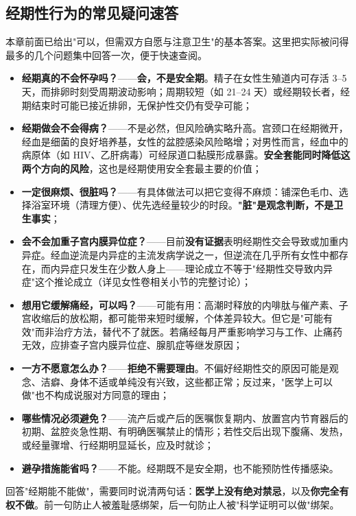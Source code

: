 \subsection{经期性行为的常见疑问速答}

本章前面已给出"可以，但需双方自愿与注意卫生"的基本答案。这里把实际被问得最多的几个问题集中回答一次，便于快速查阅。

\begin{itemize}
\item \textbf{经期真的不会怀孕吗？}——\textbf{会，不是安全期}。精子在女性生殖道内可存活 3--5 天，而排卵时刻受周期波动影响；周期较短（如 21--24 天）或经期较长者，经期结束时可能已接近排卵，无保护性交仍有受孕可能；
\item \textbf{经期做会不会得病？}——不是必然，但风险确实略升高。宫颈口在经期微开，经血是细菌的良好培养基，女性的盆腔感染风险略增；对男性而言，经血中的病原体（如 HIV、乙肝病毒）可经尿道口黏膜形成暴露。\textbf{安全套能同时降低这两个方向的风险}，这也是经期使用安全套最主要的价值；
\item \textbf{一定很麻烦、很脏吗？}——有具体做法可以把它变得不麻烦：铺深色毛巾、选择浴室环境（清理方便）、优先选经量较少的时段。\textbf{"脏"是观念判断，不是卫生事实}；
\item \textbf{会不会加重子宫内膜异位症？}——目前\textbf{没有证据}表明经期性交会导致或加重内异症。经血逆流是内异症的主流发病学说之一，但逆流在几乎所有女性中都存在，而内异症只发生在少数人身上——理论成立不等于"经期性交导致内异症"这个推论成立（详见女性卷相关小节的完整讨论）；
\item \textbf{想用它缓解痛经，可以吗？}——可能有用：高潮时释放的内啡肽与催产素、子宫收缩后的放松期，都可能带来短时缓解，个体差异较大。但它是"可能有效"而非治疗方法，替代不了就医。若痛经每月严重影响学习与工作、止痛药无效，应排查子宫内膜异位症、腺肌症等继发原因；
\item \textbf{一方不愿意怎么办？}——\textbf{拒绝不需要理由}。不偏好经期性交的原因可能是观念、洁癖、身体不适或单纯没有兴致，这些都正常；反过来，"医学上可以做"也不构成说服对方同意的理由；
\item \textbf{哪些情况必须避免？}——流产后或产后的医嘱恢复期内、放置宫内节育器后的初期、盆腔炎急性期、有明确医嘱禁止的情形；若性交后出现下腹痛、发热，或经量骤增、行经期明显延长，应及时就诊；
\item \textbf{避孕措施能省吗？}——不能。经期既不是安全期，也不能预防性传播感染。
\end{itemize}

\begin{tcolorbox}[colback=pink!5!white,colframe=red!50!black,title=贴心小叮咛]
回答"经期能不能做"，需要同时说清两句话：\textbf{医学上没有绝对禁忌}，以及\textbf{你完全有权不做}。前一句防止人被羞耻感绑架，后一句防止人被"科学证明可以做"绑架。
\end{tcolorbox}

